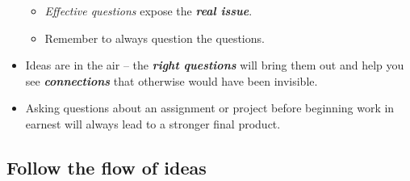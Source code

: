\documentclass[11pt]{article}
\begin{document}
\begin{itemize}
\begin{itemize}
\item \emph{Effective questions} expose the \emph{\textbf{real issue}}.

\item Remember to always question the questions.
\end{itemize}

\item Ideas are in the air -- the \emph{\textbf{right questions}} will bring them out and help you see \emph{\textbf{connections}} that otherwise would have been invisible.

\item Asking questions about an assignment or project before beginning work in earnest will always lead to a stronger final product.
\end{itemize}


\subsection{Follow the flow of ideas}
\end{document}
